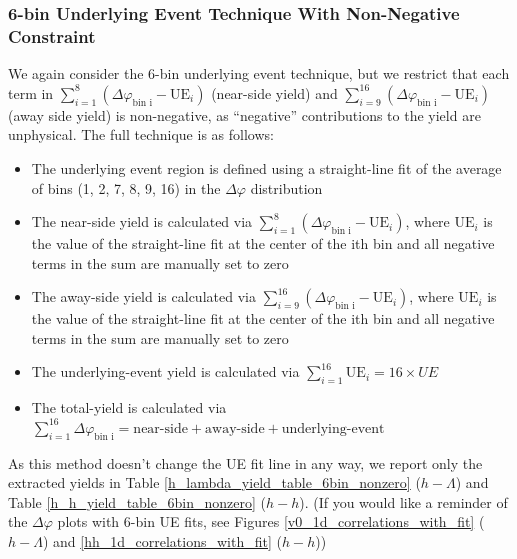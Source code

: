 \documentclass[ALICE,manyauthors]{ALICE_analysis_notes}
\begin{document}
\clearpage

\subsubsection{6-bin Underlying Event Technique With Non-Negative Constraint}
\label{6binnonneg}
We again consider the 6-bin underlying event technique, but we restrict that each term in $\sum_{i=1}^{8} (\Delta\varphi_\text{bin i} - \text{UE}_i)$ (near-side yield) and $\sum_{i=9}^{16} (\Delta\varphi_\text{bin i} - \text{UE}_i)$ (away side yield) is non-negative, as ``negative'' contributions to the yield are unphysical. The full technique is as follows:

\begin{itemize}
\item The underlying event region is defined using a straight-line fit of the average of bins (1, 2, 7, 8, 9, 16) in the $\Delta\varphi$ distribution
\item The near-side yield is calculated via $\sum_{i=1}^{8} (\Delta\varphi_\text{bin i} - \text{UE}_i)$, where $\text{UE}_i$ is the value of the straight-line fit at the center of the ith bin and all negative terms in the sum are manually set to zero
\item The away-side yield is calculated via $\sum_{i=9}^{16} (\Delta\varphi_\text{bin i} - \text{UE}_i)$, where $\text{UE}_i$ is the value of the straight-line fit at the center of the ith bin and all negative terms in the sum are manually set to zero
\item The underlying-event yield is calculated via $\sum_{i=1}^{16} \text{UE}_i = 16 \times UE$
\item The total-yield is calculated via $\sum_{i=1}^{16} \Delta\varphi_\text{bin i} = \text{near-side} + \text{away-side} + \text{underlying-event}$
\end{itemize}

As this method doesn't change the UE fit line in any way, we report only the extracted yields in Table \ref{h_lambda_yield_table_6bin_nonzero} ($h-\Lambda$) and Table \ref{h_h_yield_table_6bin_nonzero} ($h-h$). (If you would like a reminder of the $\Delta\varphi$ plots with 6-bin UE fits, see Figures \ref{v0_1d_correlations_with_fit} ($h-\Lambda$) and \ref{hh_1d_correlations_with_fit} ($h-h$))
\end{document}
